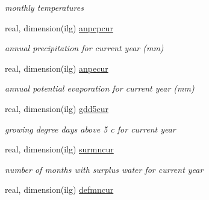 \begin{DoxyCompactItemize}
\begin{DoxyCompactList}\small\item\em monthly temperatures \end{DoxyCompactList}\item 
\hypertarget{structctem__statevars_1_1veg__gat_a223d4104c23ffc72b2d93c8becab8342}{}real, dimension(ilg) \hyperlink{structctem__statevars_1_1veg__gat_a223d4104c23ffc72b2d93c8becab8342}{anpcpcur}\label{structctem__statevars_1_1veg__gat_a223d4104c23ffc72b2d93c8becab8342}

\begin{DoxyCompactList}\small\item\em annual precipitation for current year (mm) \end{DoxyCompactList}\item 
\hypertarget{structctem__statevars_1_1veg__gat_a17bc486047d5649ac1491acf9b02e960}{}real, dimension(ilg) \hyperlink{structctem__statevars_1_1veg__gat_a17bc486047d5649ac1491acf9b02e960}{anpecur}\label{structctem__statevars_1_1veg__gat_a17bc486047d5649ac1491acf9b02e960}

\begin{DoxyCompactList}\small\item\em annual potential evaporation for current year (mm) \end{DoxyCompactList}\item 
\hypertarget{structctem__statevars_1_1veg__gat_afc7666a6ba90e49d22d3385ce95a33d2}{}real, dimension(ilg) \hyperlink{structctem__statevars_1_1veg__gat_afc7666a6ba90e49d22d3385ce95a33d2}{gdd5cur}\label{structctem__statevars_1_1veg__gat_afc7666a6ba90e49d22d3385ce95a33d2}

\begin{DoxyCompactList}\small\item\em growing degree days above 5 c for current year \end{DoxyCompactList}\item 
\hypertarget{structctem__statevars_1_1veg__gat_a19c2f10170e4d16e66258a5441c5f9be}{}real, dimension(ilg) \hyperlink{structctem__statevars_1_1veg__gat_a19c2f10170e4d16e66258a5441c5f9be}{surmncur}\label{structctem__statevars_1_1veg__gat_a19c2f10170e4d16e66258a5441c5f9be}

\begin{DoxyCompactList}\small\item\em number of months with surplus water for current year \end{DoxyCompactList}\item 
\hypertarget{structctem__statevars_1_1veg__gat_a97909b6438f3810938c18331463e1ddc}{}real, dimension(ilg) \hyperlink{structctem__statevars_1_1veg__gat_a97909b6438f3810938c18331463e1ddc}{defmncur}\label{structctem__statevars_1_1veg__gat_a97909b6438f3810938c18331463e1ddc}


\end{DoxyCompactItemize}
